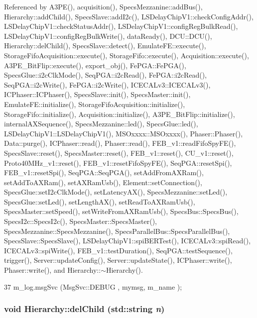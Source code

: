 Referenced by A3PE(), acquisition(), SpecsMezzanine::addBus(), Hierarchy::addChild(), SpecsSlave::addI2c(), LSDelayChipV1::checkConfigAddr(), LSDelayChipV1::checkStatusAddr(), LSDelayChipV1::configRegBulkRead(), LSDelayChipV1::configRegBulkWrite(), dataReady(), DCU::DCU(), Hierarchy::delChild(), SpecsSlave::detect(), EmulateFE::execute(), StorageFifoAcquisition::execute(), StorageFifo::execute(), Acquisition::execute(), A3PE\_\-BitFlip::execute(), export\_\-obj(), FePGA::FePGA(), SpecsGlue::i2cClkMode(), SeqPGA::i2cRead(), FePGA::i2cRead(), SeqPGA::i2cWrite(), FePGA::i2cWrite(), ICECALv3::ICECALv3(), ICPhaser::ICPhaser(), SpecsSlave::init(), SpecsMaster::init(), EmulateFE::initialize(), StorageFifoAcquisition::initialize(), StorageFifo::initialize(), Acquisition::initialize(), A3PE\_\-BitFlip::initialize(), internalAXSequence(), SpecsMezzanine::led(), SpecsGlue::led(), LSDelayChipV1::LSDelayChipV1(), MSOxxxx::MSOxxxx(), Phaser::Phaser(), Data::purge(), ICPhaser::read(), Phaser::read(), FEB\_\-v1::readFifoSpyFE(), SpecsSlave::reset(), SpecsMaster::reset(), FEB\_\-v1::reset(), CU\_\-v1::reset(), Proto40MHz\_\-v1::reset(), FEB\_\-v1::resetFifoSpyFE(), SeqPGA::resetSpi(), FEB\_\-v1::resetSpi(), SeqPGA::SeqPGA(), setAddFromAXRam(), setAddToAXRam(), setAXRamUsb(), Element::setConnection(), SpecsGlue::setI2cClkMode(), setLatencyAX(), SpecsMezzanine::setLed(), SpecsGlue::setLed(), setLengthAX(), setReadToAXRamUsb(), SpecsMaster::setSpeed(), setWriteFromAXRamUsb(), SpecsBus::SpecsBus(), SpecsI2c::SpecsI2c(), SpecsMaster::SpecsMaster(), SpecsMezzanine::SpecsMezzanine(), SpecsParallelBus::SpecsParallelBus(), SpecsSlave::SpecsSlave(), LSDelayChipV1::spiBERTest(), ICECALv3::spiRead(), ICECALv3::spiWrite(), FEB\_\-v1::testDuration(), SeqPGA::testSequence(), trigger(), Server::updateConfig(), Server::updateState(), ICPhaser::write(), Phaser::write(), and Hierarchy::$\sim$Hierarchy().


\begin{DoxyCode}
37 { m_log.msgSvc (MsgSvc::DEBUG   , mymsg, m_name ); }
\end{DoxyCode}
\hypertarget{classHierarchy_a1928ac7615fe0b5e55cd707f70dc6781}{
\subsubsection[{delChild}]{\setlength{\rightskip}{0pt plus 5cm}void Hierarchy::delChild (std::string {\em n})}}
\label{classHierarchy_a1928ac7615fe0b5e55cd707f70dc6781}


